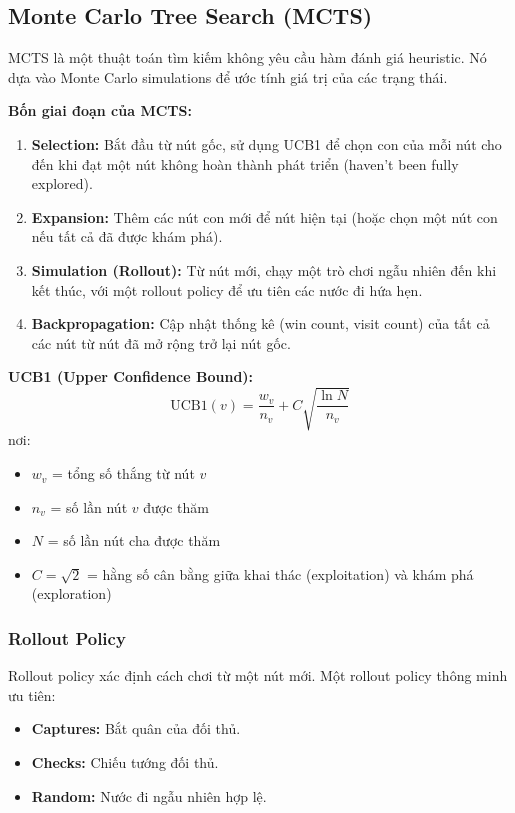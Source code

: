 \subsection{Monte Carlo Tree Search (MCTS)}
MCTS là một thuật toán tìm kiếm không yêu cầu hàm đánh giá heuristic. Nó dựa vào Monte Carlo simulations để ước tính giá trị của các trạng thái.

\textbf{Bốn giai đoạn của MCTS:}
\begin{enumerate}
    \item \textbf{Selection:} Bắt đầu từ nút gốc, sử dụng UCB1 để chọn con của mỗi nút cho đến khi đạt một nút không hoàn thành phát triển (haven't been fully explored).
    \item \textbf{Expansion:} Thêm các nút con mới để nút hiện tại (hoặc chọn một nút con nếu tất cả đã được khám phá).
    \item \textbf{Simulation (Rollout):} Từ nút mới, chạy một trò chơi ngẫu nhiên đến khi kết thúc, với một rollout policy để ưu tiên các nước đi hứa hẹn.
    \item \textbf{Backpropagation:} Cập nhật thống kê (win count, visit count) của tất cả các nút từ nút đã mở rộng trở lại nút gốc.
\end{enumerate}

\textbf{UCB1 (Upper Confidence Bound):}
$$\text{UCB1}(v) = \frac{w_v}{n_v} + C \sqrt{\frac{\ln N}{n_v}}$$
nơi:
\begin{itemize}
    \item $w_v$ = tổng số thắng từ nút $v$
    \item $n_v$ = số lần nút $v$ được thăm
    \item $N$ = số lần nút cha được thăm
    \item $C = \sqrt{2}$ = hằng số cân bằng giữa khai thác (exploitation) và khám phá (exploration)
\end{itemize}

\subsubsection{Rollout Policy}
Rollout policy xác định cách chơi từ một nút mới. Một rollout policy thông minh ưu tiên:
\begin{itemize}
    \item \textbf{Captures:} Bắt quân của đối thủ.
    \item \textbf{Checks:} Chiếu tướng đối thủ.
    \item \textbf{Random:} Nước đi ngẫu nhiên hợp lệ.
\end{itemize}

